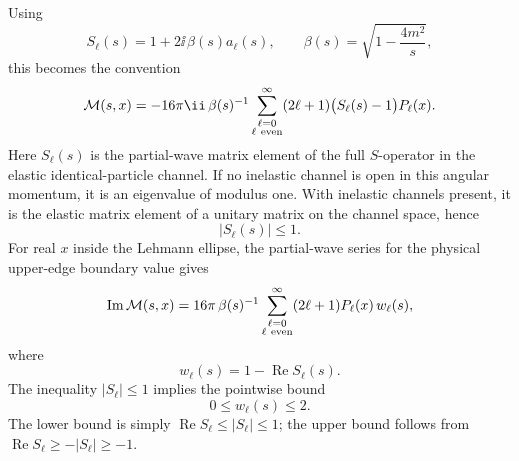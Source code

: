 Using
\[
  S_\ell(s)=1+2\ii\,\beta(s)a_\ell(s),
  \qquad
  \beta(s)=\sqrt{1-\frac{4m^2}{s}},
\]
this becomes the convention
\[
  \mathcal M(s,x)
  =
  -16\pi\ii\,\beta(s)^{-1}
  \sum_{\substack{\ell=0\\ \ell\ {\rm even}}}^{\infty}
  (2\ell+1)\bigl(S_\ell(s)-1\bigr)P_\ell(x).
\]
Here \(S_\ell(s)\) is the partial-wave matrix element of the full
\(S\)-operator in the elastic identical-particle channel.  If no inelastic
channel is open in this angular momentum, it is an eigenvalue of modulus one.
With inelastic channels present, it is the elastic matrix element of a
unitary matrix on the channel space, hence
\[
  |S_\ell(s)|\le1 .
\]
For real \(x\) inside the Lehmann ellipse, the partial-wave series for the
physical upper-edge boundary value gives
\[
  \operatorname{Im}\mathcal M(s,x)
  =
  16\pi\,\beta(s)^{-1}
  \sum_{\substack{\ell=0\\ \ell\ {\rm even}}}^{\infty}
  (2\ell+1)P_\ell(x)\,w_\ell(s),
\]
where
\[
  w_\ell(s)=1-\operatorname{Re}S_\ell(s).
\]
The inequality \(|S_\ell|\le1\) implies the pointwise bound
\[
  0\le w_\ell(s)\le2 .
\]
The lower bound is simply \(\operatorname{Re}S_\ell\le |S_\ell|\le1\); the
upper bound follows from \(\operatorname{Re}S_\ell\ge-|S_\ell|\ge-1\).

